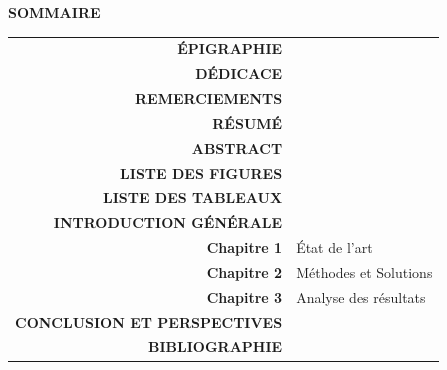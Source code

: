 \thispagestyle{empty}

\vspace*{4cm}

\begin{center}
\Large \textbf{SOMMAIRE}
\end{center}

\vspace{1cm}

\begin{center}
\begin{tabular}{rl}
\textbf{ÉPIGRAPHIE} \\[6pt]
\textbf{DÉDICACE} \\[6pt]
\textbf{REMERCIEMENTS} \\[6pt]
\textbf{RÉSUMÉ} \\[6pt]
\textbf{ABSTRACT} \\[6pt]
\textbf{LISTE DES FIGURES} \\[6pt]
\textbf{LISTE DES TABLEAUX} \\[10pt]
\textbf{INTRODUCTION GÉNÉRALE} \\[10pt]
\textbf{Chapitre 1} & État de l'art \\[6pt]
\textbf{Chapitre 2} & Méthodes et Solutions \\[6pt]
\textbf{Chapitre 3} & Analyse des résultats \\[10pt]
\textbf{CONCLUSION ET PERSPECTIVES} \\[10pt]
\textbf{BIBLIOGRAPHIE}
\end{tabular}
\end{center}

\vfill
